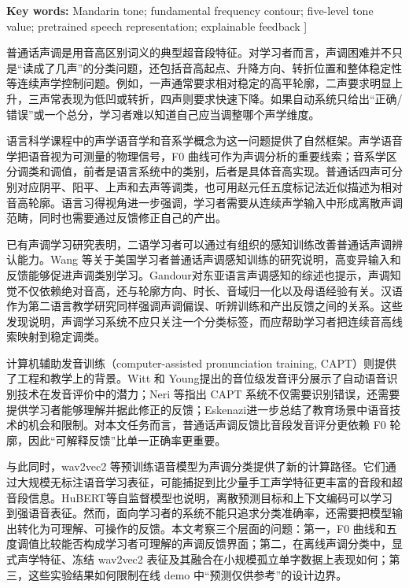 \documentclass[UTF8,a4paper,twocolumn]{ctexart}
\newcommand{\englishblock}[1]{{\zihao{5} #1}}
\begin{document}
\vspace{1mm}
\englishblock{\noindent\textbf{Key words:} Mandarin tone; fundamental frequency contour; five-level tone value; pretrained speech representation; explainable feedback}
\vspace{2mm}
]

普通话声调是用音高区别词义的典型超音段特征。对学习者而言，声调困难并不只是“读成了几声”的分类问题，还包括音高起点、升降方向、转折位置和整体稳定性等连续声学控制问题。例如，一声通常要求相对稳定的高平轮廓，二声要求明显上升，三声常表现为低凹或转折，四声则要求快速下降。如果自动系统只给出“正确/错误”或一个总分，学习者难以知道自己应当调整哪个声学维度。

语言科学课程中的声学语音学和音系学概念为这一问题提供了自然框架。声学语音学把语音视为可测量的物理信号，F0 曲线可作为声调分析的重要线索；音系学区分调类和调值，前者是语言系统中的类别，后者是具体音高实现。普通话四声可分别对应阴平、阳平、上声和去声等调类，也可用赵元任五度标记法近似描述为相对音高轮廓\cite{chao1930,zhu2010,huangliao2017}。语言习得视角进一步强调，学习者需要从连续声学输入中形成离散声调范畴，同时也需要通过反馈修正自己的产出\cite{liuxun2000}。

已有声调学习研究表明，二语学习者可以通过有组织的感知训练改善普通话声调辨认能力。Wang 等\cite{wang1999}关于美国学习者普通话声调感知训练的研究说明，高变异输入和反馈能够促进声调类别学习。Gandour\cite{gandour1983}对东亚语言声调感知的综述也提示，声调知觉不仅依赖绝对音高，还与轮廓方向、时长、音域归一化以及母语经验有关。汉语作为第二语言教学研究同样强调声调偏误、听辨训练和产出反馈之间的关系\cite{zhaojinming2004,liuxun2000}。这些发现说明，声调学习系统不应只关注一个分类标签，而应帮助学习者把连续音高线索映射到稳定调类。

计算机辅助发音训练（computer-assisted pronunciation training, CAPT）则提供了工程和教学上的背景。Witt 和 Young\cite{witt2000}提出的音位级发音评分展示了自动语音识别技术在发音评价中的潜力；Neri 等\cite{neri2002}指出 CAPT 系统不仅需要识别错误，还需要提供学习者能够理解并据此修正的反馈；Eskenazi\cite{eskenazi2009}进一步总结了教育场景中语音技术的机会和限制。对本文任务而言，普通话声调反馈比音段发音评分更依赖 F0 轮廓，因此“可解释反馈”比单一正确率更重要。

与此同时，wav2vec2 等预训练语音模型为声调分类提供了新的计算路径\cite{baevski2020}。它们通过大规模无标注语音学习表征，可能捕捉到比少量手工声学特征更丰富的音段和超音段信息。HuBERT\cite{hsu2021}等自监督模型也说明，离散预测目标和上下文编码可以学习到强语音表征。然而，面向学习者的系统不能只追求分类准确率，还需要把模型输出转化为可理解、可操作的反馈。本文考察三个层面的问题：第一，F0 曲线和五度调值比较能否构成学习者可理解的声调反馈界面；第二，在离线声调分类中，显式声学特征、冻结 wav2vec2 表征及其融合在小规模孤立单字数据上表现如何；第三，这些实验结果如何限制在线 demo 中“预测仅供参考”的设计边界。
\end{document}
